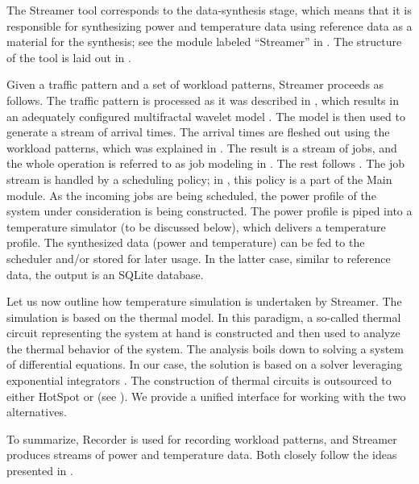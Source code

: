 
The Streamer tool corresponds to the data-synthesis stage, which means that it
is responsible for synthesizing power and temperature data using reference data
as a material for the synthesis; see the module labeled ``Streamer'' in
. The structure of the tool is laid out in .

Given a traffic pattern and a set of workload patterns, Streamer proceeds as
follows. The traffic pattern is processed as it was described in ,
which results in an adequately configured multifractal wavelet model
\cite{riedi1999}. The model is then used to generate a stream of arrival times.
The arrival times are fleshed out using the workload patterns, which was
explained in . The result is a stream of jobs, and the whole
operation is referred to as job modeling in . The rest follows
. The job stream is handled by a scheduling policy; in
, this policy is a part of the Main module. As the incoming jobs
are being scheduled, the power profile of the system under consideration is
being constructed. The power profile is piped into a temperature simulator (to
be discussed below), which delivers a temperature profile. The synthesized data
(power and temperature) can be fed to the scheduler and/or stored for later
usage. In the latter case, similar to reference data, the output is an SQLite
database.

Let us now outline how temperature simulation is undertaken by Streamer. The
simulation is based on the thermal  model. In this paradigm, a so-called
thermal  circuit representing the system at hand is constructed and then
used to analyze the thermal behavior of the system. The analysis boils down to
solving a system of differential equations. In our case, the solution is based
on a solver leveraging exponential integrators \cite{ukhov2014}. The
construction of thermal circuits is outsourced to either HotSpot
\cite{skadron2004} or  \cite{sridhar2010} (see ). We
provide a unified interface for working with the two alternatives.

To summarize, Recorder is used for recording workload patterns, and Streamer
produces streams of power and temperature data. Both closely follow the ideas
presented in .
